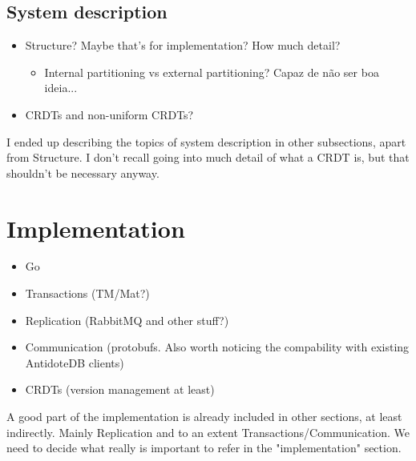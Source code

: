 \documentclass{vldb}
\newcommand{\grumbler}[2]{{\color{red}{\bf #1:} #2}}
\newcommand{\andre}[1]{\grumbler{andre}{#1}}
\begin{document}
\subsection{System description}

\begin{itemize}
	\item Structure? Maybe that's for implementation? How much detail?
	\begin{itemize}
		\item Internal partitioning vs external partitioning? Capaz de não ser boa ideia...	
	\end{itemize}
	\item CRDTs and non-uniform CRDTs?
\end{itemize}

\andre{I ended up describing the topics of system description in other subsections, apart from Structure. I don't recall going into much detail of what a CRDT is, but that shouldn't be necessary anyway.}

\section{Implementation}

\begin{itemize}
	\item Go
	\item Transactions (TM/Mat?)
	\item Replication (RabbitMQ and other stuff?)
	\item Communication (protobufs. Also worth noticing the compability with existing AntidoteDB clients)
	\item CRDTs (version management at least)
\end{itemize}

\andre{A good part of the implementation is already included in other sections, at least indirectly. Mainly Replication and to an extent Transactions/Communication. We need to decide what really is important to refer in the "implementation" section.}
\end{document}
